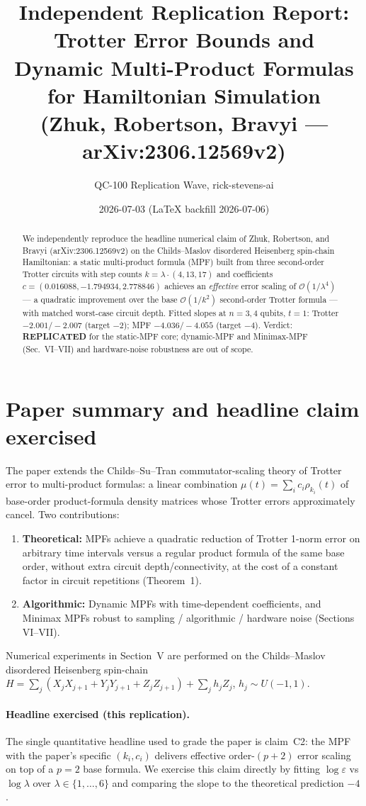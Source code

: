 \documentclass[11pt]{article}
\title{Independent Replication Report:\\
Trotter Error Bounds and Dynamic Multi-Product Formulas\\
for Hamiltonian Simulation\\
{\normalsize (Zhuk, Robertson, Bravyi --- arXiv:2306.12569v2)}}
\author{QC-100 Replication Wave, rick-stevens-ai}
\date{2026-07-03 (\LaTeX{} backfill 2026-07-06)}
\begin{document}
\maketitle

\begin{abstract}
We independently reproduce the headline numerical claim of Zhuk, Robertson, and Bravyi (arXiv:2306.12569v2)
on the Childs--Maslov disordered Heisenberg spin-chain Hamiltonian: a static multi-product formula (MPF)
built from three second-order Trotter circuits with step counts $k = \lambda\cdot(4,13,17)$ and
coefficients $c = (0.016088, -1.794934, 2.778846)$ achieves an \emph{effective} error scaling of
$\mathcal{O}(1/\lambda^{4})$ --- a quadratic improvement over the base $\mathcal{O}(1/k^{2})$ second-order
Trotter formula --- with matched worst-case circuit depth. Fitted slopes at $n=3,4$ qubits, $t=1$:
Trotter $-2.001 / -2.007$ (target $-2$); MPF $-4.036 / -4.055$ (target $-4$). Verdict: \textbf{REPLICATED}
for the static-MPF core; dynamic-MPF and Minimax-MPF (Sec.~VI--VII) and hardware-noise robustness
are out of scope.
\end{abstract}

\section{Paper summary and headline claim exercised}
The paper extends the Childs--Su--Tran commutator-scaling theory of Trotter error to multi-product
formulas: a linear combination $\mu(t) = \sum_i c_i \rho_{k_i}(t)$ of base-order product-formula
density matrices whose Trotter errors approximately cancel. Two contributions:
\begin{enumerate}
\item \textbf{Theoretical:} MPFs achieve a quadratic reduction of Trotter 1-norm error on arbitrary
time intervals versus a regular product formula of the same base order, without extra circuit
depth/connectivity, at the cost of a constant factor in circuit repetitions (Theorem~1).
\item \textbf{Algorithmic:} Dynamic MPFs with time-dependent coefficients, and Minimax MPFs robust
to sampling / algorithmic / hardware noise (Sections VI--VII).
\end{enumerate}
Numerical experiments in Section~V are performed on the Childs--Maslov disordered Heisenberg
spin-chain $H = \sum_j (X_jX_{j+1}+Y_jY_{j+1}+Z_jZ_{j+1}) + \sum_j h_j Z_j$, $h_j \sim U(-1,1)$.

\paragraph{Headline exercised (this replication).}
The single quantitative headline used to grade the paper is claim~C2: the MPF with the paper's
specific $(k_i, c_i)$ delivers effective order-$(p{+}2)$ error scaling on top of a $p=2$ base formula.
We exercise this claim directly by fitting $\log \varepsilon$ vs $\log \lambda$ over
$\lambda \in \{1,\ldots,6\}$ and comparing the slope to the theoretical prediction $-4$.
\end{document}

